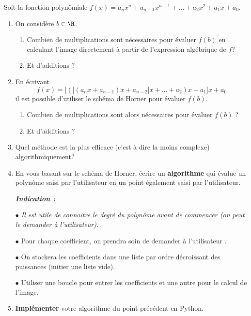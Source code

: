\begin{boxexstheorieligne}
\eexo


\exo
Soit la fonction polynômiale $f(x)=a_nx^n+a_{n-1}x^{n-1}+ ... + a_2x^2+a_1x+a_0$.
\begin{enumerate}[label=\alph*),itemsep=4mm]
\item On considère $b\in \R$.
\begin{enumerate}[label=\roman*),itemsep=1mm]
\item Combien de multiplications sont nécessaires pour évaluer $f(b)$ en calculant l'image directement à partir de l'expression algébrique de $f$?
\item Et d'additions ?
\end{enumerate}
\item En écrivant $$f(x)=\Big[\left(\big[\left(a_nx+a_{n-1}\right)x+a_{n-2}\big]x+ ...  +a_2\right)x+a_1\Big]x+a_0$$ il est possible d'utiliser le schéma de Horner pour évaluer $f(b)$.
\begin{enumerate}[label=\roman*),itemsep=1mm]
\item Combien de multiplications sont alors nécessaires pour évaluer $f(b)$ ?
\item Et d'additions ?
\end{enumerate}
\item Quel méthode est la plus efficace (c'est à dire la moins complexe) algorithmiquement?
\item En vous basant sur le schéma de Horner, écrire un {\bf algorithme} qui évalue un polynôme saisi par l'utilisateur en un point également saisi par l'utilisateur.

\textit{\footnotesize\textbf{Indication :}} \begin{minipage}[t]{0.9\textwidth}\footnotesize\itshape
$\bullet$ Il est utile de connaitre le degré du polynôme avant de commencer (on peut le demander à l'utilisateur).

\vspace{2mm}
$\bullet$ Pour chaque coefficient, on prendra soin de demander à l'utilisateur .

\vspace{2mm}
$\bullet$ On stockera les coefficients dans une liste par ordre décroissant des puissances (initier une liste vide).

\vspace{2mm}
$\bullet$ Utiliser une boucle pour entrer les coefficients et une autre pour le calcul de l'image.
\end{minipage}
\item {\bf Implémenter} votre algorithme du point précédent en Python.
\end{enumerate}
\end{boxexstheorieligne}




